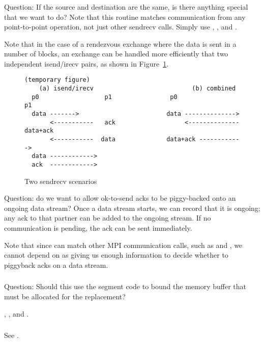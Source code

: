 \documentclass{article}
\begin{document}
\subsubsection{}
Question: If the source and destination are the same, is there anything
special that we want to do?  Note that this routine matches communication from
any point-to-point operation, not just other sendrecv calls.  
Simply use , , and
. 

Note that in the case of a rendezvous exchange where the data is sent
in a number of blocks, an exchange can be handled more efficiently
that two independent isend/irecv pairs, as shown in Figure~\ref{fig:sendrecv}.
\begin{figure}
\begin{verbatim}
(temporary figure)
    (a) isend/irecv                           (b) combined
  p0                  p1                p0                   p1
  data ------->                        data -------------->
       <-----------   ack                   <-------------- data+ack
       <-----------  data              data+ack ------------>
  data ------------>
  ack  ------------>
\end{verbatim}
\caption{Two sendrecv scenarios}\label{fig:sendrecv}
\end{figure}
Question: do we want to allow ok-to-send acks to be piggy-backed onto
an ongoing data stream?  Once a data stream starts, we can record that
it is ongoing; any ack to that partner can be added to the ongoing
stream.  If no communication is pending, the ack can be sent
immediately.

Note that since  can match other MPI
communication calls, such as  and
, we cannot depend on  as
giving us enough information to decide whether to piggyback acks on a
data stream.
\subsubsection{}
Question: Should this use the segment code to bound the memory buffer that
must be allocated for the replacement?
\begin{adi3}
, , and
. 
\end{adi3}

\subsubsection{}
See .
\end{document}
